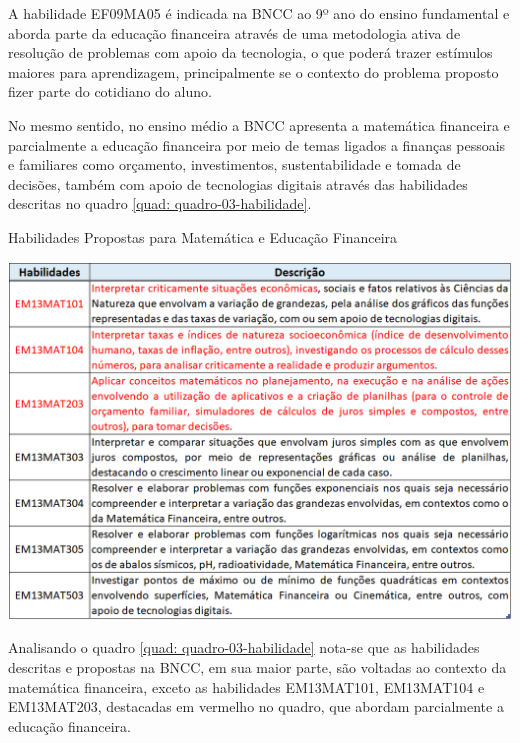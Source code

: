 A habilidade EF09MA05 é indicada na BNCC ao 9º ano do ensino fundamental e aborda parte da educação financeira através de uma metodologia ativa de resolução de problemas com apoio da tecnologia, o que poderá trazer estímulos maiores para aprendizagem, principalmente se o contexto do problema proposto fizer parte do cotidiano do aluno.

No mesmo sentido, no ensino médio a BNCC apresenta a matemática financeira e parcialmente a educação financeira por meio de temas ligados a finanças pessoais e familiares como orçamento, investimentos, sustentabilidade e tomada de decisões, também com apoio de tecnologias digitais através das habilidades descritas no quadro \ref{quad: quadro-03-habilidade}.

\graphicspath{{quadros/}}
\begin{quadro}[!ht]
\centering
\begin{minipage}{1.\textwidth}
\caption{Habilidades Propostas para Matemática e Educação Financeira}
\centering
\includegraphics[width=1\textwidth]{quadro-03-habilidades}
\label{quad: quadro-03-habilidade}
\end{minipage}
\end{quadro}

Analisando o quadro \ref{quad: quadro-03-habilidade} nota-se que as habilidades descritas e propostas na BNCC, em sua maior parte, são voltadas ao contexto da matemática financeira, exceto as habilidades EM13MAT101, EM13MAT104 e EM13MAT203, destacadas em vermelho no quadro, que abordam parcialmente a educação financeira.

